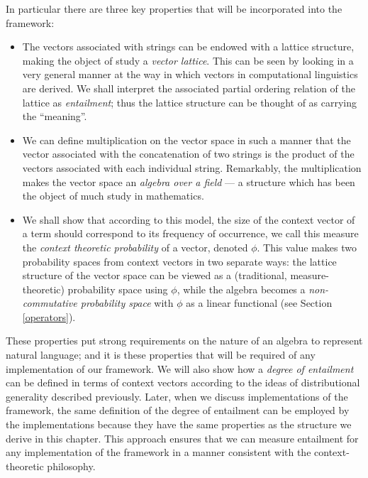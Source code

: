 In particular there are three key properties that will be incorporated into the framework:
\begin{itemize}
\item The vectors associated with strings can be endowed with a lattice structure, making the object of study a \emph{vector lattice}. This can be seen by looking in a very general manner at the way in which vectors in computational linguistics are derived. We shall interpret the associated partial ordering relation of the lattice as \emph{entailment}; thus the lattice structure can be thought of as carrying the ``meaning''.
\item We can define multiplication on the vector space in such a manner that the vector associated with the concatenation of two strings is the product of the vectors associated with each individual string. Remarkably, the multiplication makes the vector space an \emph{algebra over a field} --- a structure which has been the object of much study in mathematics.
\item We shall show that according to this model, the size of the context vector of a term should correspond to its frequency of occurrence, we call this measure the \emph{context theoretic probability} of a vector, denoted $\phi$. This value makes two probability spaces from context vectors in two separate ways: the lattice structure of the vector space can be viewed as a (traditional, measure-theoretic) probability space using $\phi$, while the algebra becomes a \emph{non-commutative probability space} with $\phi$ as a linear functional (see Section \ref{operators}).
\end{itemize}
These properties put strong requirements on the nature of an algebra to represent natural language; and it is these properties that will be required of any implementation of our framework. We will also show how a \emph{degree of entailment} can be defined in terms of context vectors according to the ideas of distributional generality described previously. Later, when we discuss implementations of the framework, the same definition of the degree of entailment can be employed by the implementations because they have the same properties as the structure we derive in this chapter. This approach ensures that we can measure entailment for any implementation of the framework in a manner consistent with the context-theoretic philosophy.

